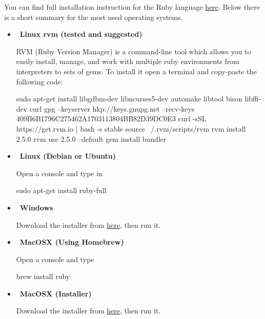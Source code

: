 You can find full installation instruction for the Ruby language \href{https://www.ruby-lang.org/en/documentation/installation/}{here}. Below there is a short summary for the most used operating systems.

\begin{itemize}
\item~\textbf{Linux rvm (tested and suggested)}

RVM (Ruby Version Manager) is a command-line tool which allows you to easily install, manage, and work with multiple ruby environments from interpreters to sets of gems. To install it open a terminal and copy-paste the following code: \\
\begin{commandshell}
sudo apt-get install libgdbm-dev libncurses5-dev automake libtool bison libffi-dev curl
gpg --keyserver hkp://keys.gnupg.net --recv-keys 409B6B1796C275462A1703113804BB82D39DC0E3
curl -sSL https://get.rvm.io | bash -s stable
source ~/.rvm/scripts/rvm
rvm install 2.5.0
rvm use 2.5.0 --default
gem install bundler
\end{commandshell}

\item~\textbf{Linux (Debian or Ubuntu)}

Open a console and type in \begin{commandshell}sudo apt-get install ruby-full\end{commandshell}

\item~\textbf{Windows}

Download the installer from \href{http://railsinstaller.org/en}{here}, then run it.

\item~\textbf{MacOSX (Using Homebrew)}

Open a console and type \begin{commandshell}brew install ruby\end{commandshell}

\item~\textbf{MacOSX (Installer)}

Download the installer from \href{http://railsinstaller.org/en}{here}, then run it.
\end{itemize}